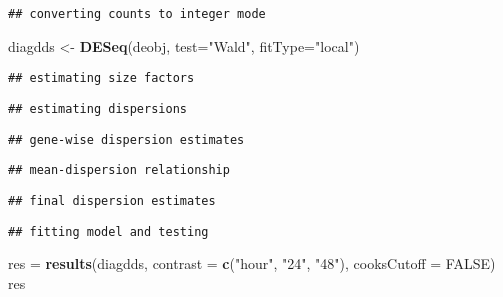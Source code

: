 \documentclass[]{article}
\newenvironment{Shaded}{\begin{snugshade}}{\end{snugshade}}
\newcommand{\KeywordTok}[1]{\textcolor[rgb]{0.13,0.29,0.53}{\textbf{#1}}}
\newcommand{\DataTypeTok}[1]{\textcolor[rgb]{0.13,0.29,0.53}{#1}}
\newcommand{\StringTok}[1]{\textcolor[rgb]{0.31,0.60,0.02}{#1}}
\newcommand{\OtherTok}[1]{\textcolor[rgb]{0.56,0.35,0.01}{#1}}
\newcommand{\NormalTok}[1]{#1}
\begin{document}
\begin{verbatim}
## converting counts to integer mode
\end{verbatim}

\begin{Shaded}
\begin{Highlighting}[]
\NormalTok{diagdds <-}\StringTok{ }\KeywordTok{DESeq}\NormalTok{(deobj, }\DataTypeTok{test=}\StringTok{"Wald"}\NormalTok{, }\DataTypeTok{fitType=}\StringTok{"local"}\NormalTok{)}
\end{Highlighting}
\end{Shaded}

\begin{verbatim}
## estimating size factors
\end{verbatim}

\begin{verbatim}
## estimating dispersions
\end{verbatim}

\begin{verbatim}
## gene-wise dispersion estimates
\end{verbatim}

\begin{verbatim}
## mean-dispersion relationship
\end{verbatim}

\begin{verbatim}
## final dispersion estimates
\end{verbatim}

\begin{verbatim}
## fitting model and testing
\end{verbatim}

\begin{Shaded}
\begin{Highlighting}[]
\NormalTok{res =}\StringTok{ }\KeywordTok{results}\NormalTok{(diagdds, }\DataTypeTok{contrast =} \KeywordTok{c}\NormalTok{(}\StringTok{"hour"}\NormalTok{, }\StringTok{"24"}\NormalTok{, }\StringTok{"48"}\NormalTok{), }\DataTypeTok{cooksCutoff =} \OtherTok{FALSE}\NormalTok{)}
\NormalTok{res}
\end{Highlighting}
\end{Shaded}
\end{document}
